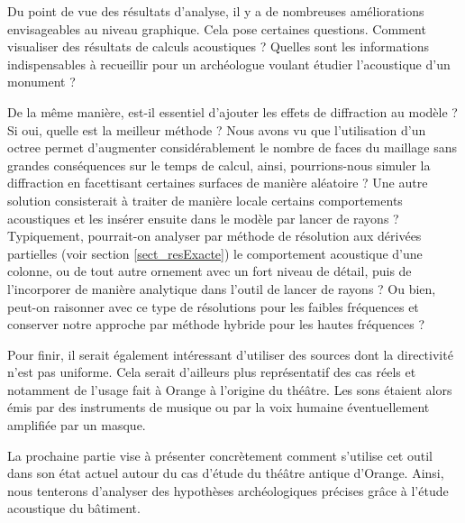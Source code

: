 Du point de vue des résultats d'analyse, il y a de nombreuses améliorations envisageables au niveau graphique. Cela pose certaines questions. Comment visualiser des résultats de calculs acoustiques ? Quelles sont les informations indispensables à recueillir pour un archéologue voulant étudier l'acoustique d'un monument ? 

De la même manière, est-il essentiel d'ajouter les effets de diffraction au modèle ? Si oui, quelle est la meilleur méthode ? Nous avons vu que l'utilisation d'un \gls{octree} permet d'augmenter considérablement le nombre de faces du maillage sans grandes conséquences sur le temps de calcul, ainsi, pourrions-nous simuler la diffraction en facettisant certaines surfaces de manière aléatoire ? Une autre solution consisterait à traiter de manière locale certains comportements acoustiques et les insérer ensuite dans le modèle par lancer de rayons ? Typiquement, pourrait-on analyser par méthode de résolution aux dérivées partielles (voir section \ref{sect_resExacte}) le comportement acoustique d'une colonne, ou de tout autre ornement avec un fort niveau de détail, puis de l'incorporer de manière analytique dans l'outil de lancer de rayons ? Ou bien, peut-on raisonner avec ce type de résolutions pour les faibles fréquences et conserver notre approche par méthode hybride pour les hautes fréquences ?

Pour finir, il serait également intéressant d'utiliser des sources dont la directivité n'est pas uniforme. Cela serait d'ailleurs plus représentatif des cas réels et notamment de l'usage fait à Orange à l'origine du théâtre. Les sons étaient alors émis par des instruments de musique ou par la voix humaine éventuellement amplifiée par un masque.

 La prochaine partie vise à présenter concrètement comment s'utilise cet outil dans son état actuel autour du cas d'étude du théâtre antique d'Orange. Ainsi, nous tenterons d'analyser des hypothèses archéologiques précises grâce à l'étude acoustique du bâtiment.




\newpage
	
 
 
